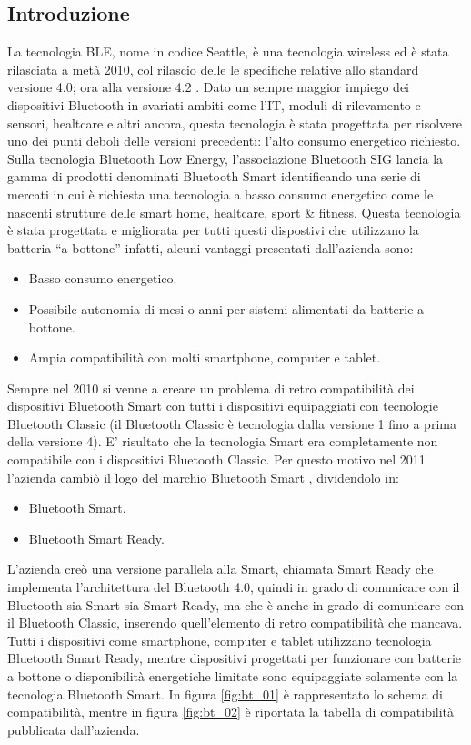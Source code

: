  \subsection{Introduzione}
La tecnologia \acf{BLE}, nome in codice Seattle, è una tecnologia wireless ed è stata rilasciata a metà 2010, col rilascio delle le specifiche relative allo standard versione 4.0; ora alla versione 4.2 \cite{BT-CoreSpec4.0} . Dato un sempre maggior impiego dei dispositivi Bluetooth in svariati ambiti come l'IT, moduli di rilevamento e sensori, healtcare \cite{BT-SmartMarks} e altri ancora, questa tecnologia è stata progettata per risolvere uno dei punti deboli delle versioni precedenti: l'alto consumo energetico richiesto. Sulla tecnologia Bluetooth Low Energy, l'associazione Bluetooth SIG lancia la gamma di prodotti denominati Bluetooth Smart identificando una serie di mercati in cui è richiesta una tecnologia a basso consumo energetico come le nascenti strutture delle smart home, healtcare, sport \& fitness. Questa tecnologia è stata progettata e migliorata per tutti questi dispostivi che utilizzano la batteria “a bottone” infatti, alcuni vantaggi presentati dall'azienda sono:
\begin{itemize}
	\item Basso consumo energetico.
	\item Possibile autonomia di mesi o anni per sistemi alimentati da batterie a bottone.
	\item Ampia compatibilità con molti smartphone, computer e tablet.
\end{itemize}
 Sempre nel 2010 si venne a creare un problema di retro compatibilità dei dispositivi Bluetooth Smart con tutti i dispositivi equipaggiati con tecnologie Bluetooth Classic (il Bluetooth Classic è tecnologia dalla versione 1 fino a prima della versione 4). E' risultato che la tecnologia Smart era completamente non compatibile con i dispositivi Bluetooth Classic. Per questo motivo nel 2011 l'azienda cambiò il logo del marchio Bluetooth Smart \cite{BT-Brand}, dividendolo in:
 \begin{itemize}
 	\item Bluetooth Smart.
 	\item Bluetooth Smart Ready.
 \end{itemize}
 L'azienda creò una versione parallela alla Smart, chiamata Smart Ready che implementa l'architettura del Bluetooth 4.0, quindi in grado di comunicare con il Bluetooth sia Smart sia Smart Ready, ma che è anche in grado di comunicare con il Bluetooth Classic, inserendo quell'elemento di retro compatibilità che mancava. Tutti i dispositivi come smartphone, computer e tablet utilizzano tecnologia Bluetooth Smart Ready, mentre dispositivi progettati per funzionare con batterie a bottone o disponibilità energetiche limitate sono equipaggiate solamente con la tecnologia Bluetooth Smart. In figura \ref{fig:bt_01} è rappresentato lo schema di compatibilità, mentre in figura \ref{fig:bt_02} è riportata la tabella di compatibilità pubblicata dall'azienda. 
 
